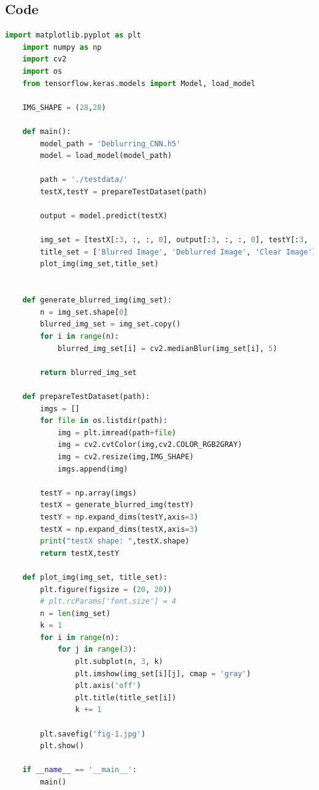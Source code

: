 \documentclass{article}
\begin{document}
{    \subsection{Code}
    \lstset{style=mystyle}
    \begin{lstlisting}[language=Python, caption=Code for blurring and deblurring images]
    import matplotlib.pyplot as plt
    import numpy as np
    import cv2
    import os
    from tensorflow.keras.models import Model, load_model
    
    IMG_SHAPE = (28,28)
    
    def main():    
        model_path = 'Deblurring_CNN.h5'
        model = load_model(model_path)
        
        path = './testdata/'
        testX,testY = prepareTestDataset(path)
    
        output = model.predict(testX)
    
        img_set = [testX[:3, :, :, 0], output[:3, :, :, 0], testY[:3, :, :, 0]]
        title_set = ['Blurred Image', 'Deblurred Image', 'Clear Image']
        plot_img(img_set,title_set)
    
    
    def generate_blurred_img(img_set):
    	n = img_set.shape[0]
    	blurred_img_set = img_set.copy()
    	for i in range(n):
    		blurred_img_set[i] = cv2.medianBlur(img_set[i], 5)
    
    	return blurred_img_set
    
    def prepareTestDataset(path):
        imgs = []
        for file in os.listdir(path):
            img = plt.imread(path+file)
            img = cv2.cvtColor(img,cv2.COLOR_RGB2GRAY)
            img = cv2.resize(img,IMG_SHAPE)
            imgs.append(img)
        
        testY = np.array(imgs)
        testX = generate_blurred_img(testY)
        testY = np.expand_dims(testY,axis=3)
        testX = np.expand_dims(testX,axis=3)
        print("testX shape: ",testX.shape)
        return testX,testY
    
    def plot_img(img_set, title_set):
    	plt.figure(figsize = (20, 20))
    	# plt.rcParams['font.size'] = 4
    	n = len(img_set)
    	k = 1
    	for i in range(n):
    		for j in range(3):
    			plt.subplot(n, 3, k)
    			plt.imshow(img_set[i][j], cmap = 'gray')
    			plt.axis('off')
    			plt.title(title_set[i])
    			k += 1
    
    	plt.savefig('fig-1.jpg')
    	plt.show()
    
    if __name__ == '__main__':
        main()


\end{lstlisting}}
\end{document}
